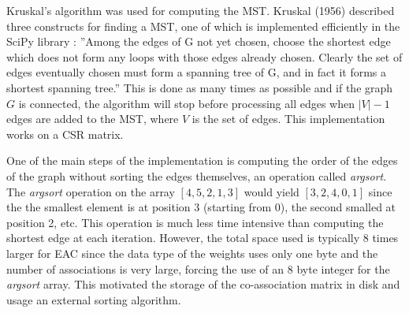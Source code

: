 \noindent Kruskal's algorithm was used for computing the MST.
Kruskal (1956) described three constructs for finding a MST, one of which is implemented efficiently in the SciPy library \cite{JonesSciPy}: %
''Among the edges of G not yet chosen, choose the shortest edge which does not form any loops with those edges already chosen. Clearly the set of edges eventually chosen must form a spanning tree of G, and in fact it forms a shortest spanning tree.''
This is done as many times as possible and if the graph $G$ is connected, the algorithm will stop before processing all edges when $|V| - 1$ edges are added to the MST, where $V$ is the set of edges.
This implementation works on a CSR matrix. %




One of the main steps of the implementation is computing the order of the edges of the graph without sorting the edges themselves, an operation called \emph{argsort}.
The \emph{argsort} operation on the array $ \left [  4 , 5 , 2 , 1, 3 \right ]$ would yield $ \left [  3 , 2 , 4, 0 , 1 \right ]$ since the the smallest element is at position 3 (starting from 0), the second smalled at position 2, etc. %
This operation is much less time intensive than computing the shortest edge at each iteration.
However, the total space used is typically 8 times larger for EAC since the data type of the weights uses only one byte and the number of associations is very large, forcing the use of an 8 byte integer for the \emph{argsort} array. %
This motivated the storage of the co-association matrix in disk and usage an external sorting algorithm.

